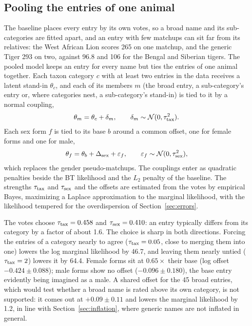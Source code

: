 \documentclass[11pt]{article}
\begin{document}
\subsection{Pooling the entries of one animal}
\label{sec:pooling}
The baseline places every entry by its own votes, so a broad name and its sub-categories are fitted apart, and an entry with few matchups can sit far from its relatives: the West African Lion scores 265 on one matchup, and the generic Tiger 293 on two, against 96.8 and 106 for the Bengal and Siberian tigers. The pooled model keeps an entry for every name but ties the entries of one animal together. Each taxon category $c$ with at least two entries in the data receives a latent stand-in $\theta_c$, and each of its members $m$ (the broad entry, a sub-category's entry or, where categories nest, a sub-category's stand-in) is tied to it by a normal coupling,
\begin{equation}
\theta_m=\theta_c+\delta_m,\qquad \delta_m\sim\mathcal N(0,\tau_{\rm tax}^2).
\end{equation}
Each sex form $f$ is tied to its base $b$ around a common offset, one for female forms and one for male,
\begin{equation}
\theta_f=\theta_b+\Delta_{\rm sex}+\varepsilon_f,\qquad \varepsilon_f\sim\mathcal N(0,\tau_{\rm sex}^2),
\end{equation}
which replaces the gender pseudo-matchups. The couplings enter as quadratic penalties beside the BT likelihood and the $L_2$ penalty of the baseline. The strengths $\tau_{\rm tax}$ and $\tau_{\rm sex}$ and the offsets are estimated from the votes by empirical Bayes, maximizing a Laplace approximation to the marginal likelihood, with the likelihood tempered for the overdispersion of Section~\ref{sec:errors}.

The votes choose $\tau_{\rm tax}=0.458$ and $\tau_{\rm sex}=0.410$: an entry typically differs from its category by a factor of about 1.6. The choice is sharp in both directions. Forcing the entries of a category nearly to agree ($\tau_{\rm tax}=0.05$, close to merging them into one) lowers the log marginal likelihood by 46.7, and leaving them nearly untied ($\tau_{\rm tax}=2$) lowers it by 64.4. Female forms sit at $0.65\times$ their base (log offset $-0.424\pm0.088$); male forms show no offset ($-0.096\pm0.180$), the base entry evidently being imagined as a male. A shared offset for the 45 broad entries, which would test whether a broad name is rated above its own category, is not supported: it comes out at $+0.09\pm0.11$ and lowers the marginal likelihood by 1.2, in line with Section~\ref{sec:inflation}, where generic names are not inflated in general.
\end{document}
